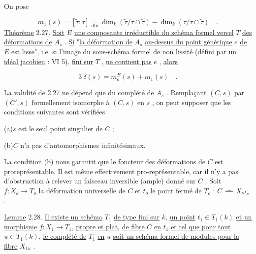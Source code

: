On pose

\begin{equation*}
m_{1}(s) = [\widetilde{\tau} : \tau] \mathop{=}\limits_{\mathrm{dfn}} \dim_{k}(\widetilde{\tau}/\tau \cap \widetilde{\tau}) - \dim_{k}(\tau/\tau\cap\widetilde{\tau}) \quad .
\end{equation*}
\underline{Théorème} 2.27.  \underline{Soit}  $E$  \underline{une composante irréductible du schéma formel versel}  $T$  \underline{des déformations de}  $A_{s}$ . \underline{Si}  "\underline{la déformation de}  $A_{s}$  \underline{au-dessus du point générique}  $e$  \underline{de}  $E$  \underline{est lisse}", \underline{i.e.} \underline{si l'image du sous-schéma formel de non lissité} (\underline{défini par un idéal jacobien} : VI 5), \underline{fini sur}  $T$ , \underline{ne contient pas}  $e$ , \underline{alors}

\begin{equation*}
3\ \delta(s) = m_{o}^{E}(s) + m_{1}(s) \quad .
\end{equation*}


La validité de 2.27 ne dépend que du complété de $A_s$ . Remplaçant $(C,s)$ par $(C',s)$ formellement isomorphe à $(C,s)$ en $s$ , on peut supposer que les conditions suivantes sont vérifiées

(a)\quad $s$ est le seul point singulier de $C$ ;

(b)\quad $C$ n'a pas d'automorphismes infinitésimaux.

La condition (b) nous garantit que le foncteur des déformations de $C$ est proreprésentable. Il est même effectivement pro-représentable, car il n'y a pas d'obstruction à relever un faisceau inversible (ample) donné sur $C$ . Soit $f : X_o \longrightarrow T_o$ la déformation universelle de $C$ et $t_o$ le point fermé de $T_o$ : $C \stackrel{\sim}{\relbar\joinrel\relbar} X_{ot_o}$.

\underline{Lemme} 2.28. \quad \underline{Il existe un schéma} $T_1$ \underline{de type fini sur} $k$, \underline{un point} $t_1 \in T_1(k)$ \underline{et un morphisme} $f : X_1 \longrightarrow T_1$, \underline{propre et plat,} \underline{de fibre} $C$ \underline{en} $t_1$ \underline{et tel que pour tout} $u \in T_1(k)$, \underline{le complété de} $T_1$ \underline{en} $u$ \underline{soit un schéma formel de modules pour la fibre} $X_{1u}$ .

